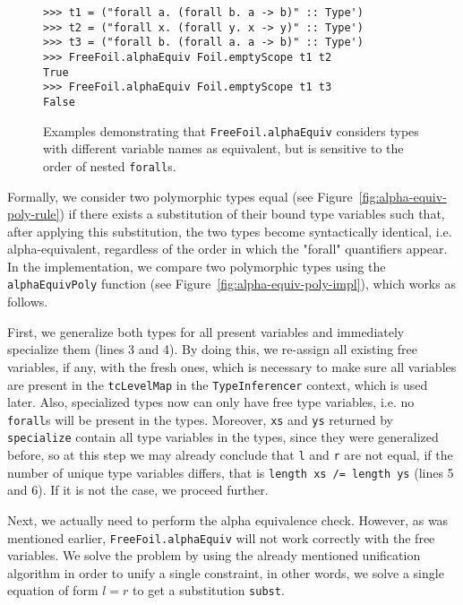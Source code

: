 \begin{figure}[H]
  \begin{verbatim}
>>> t1 = ("forall a. (forall b. a -> b)" :: Type')
>>> t2 = ("forall x. (forall y. x -> y)" :: Type')
>>> t3 = ("forall b. (forall a. a -> b)" :: Type')
>>> FreeFoil.alphaEquiv Foil.emptyScope t1 t2
True
>>> FreeFoil.alphaEquiv Foil.emptyScope t1 t3
False
  \end{verbatim}
  \caption[\texttt{FreeFoil.alphaEquiv} usage examples (2)]{Examples demonstrating that \texttt{FreeFoil.alphaEquiv} considers types with different variable names as equivalent, but is sensitive to the order of nested \texttt{forall}s.}
  \label{fig:freefoil-alphaequiv-foralls}
\end{figure}

Formally, we consider two polymorphic types equal (see Figure~\ref{fig:alpha-equiv-poly-rule}) if there exists a substitution of their bound type variables such that, after applying this substitution, the two types become syntactically identical, i.e. alpha-equivalent, regardless of the order in which the "forall" quantifiers appear. In the implementation, we compare two polymorphic types using the \texttt{alphaEquivPoly} function (see Figure~\ref{fig:alpha-equiv-poly-impl}), which works as follows.

First, we generalize both types for all present variables and immediately specialize them (lines 3 and 4). By doing this, we re-assign all existing free variables, if any, with the fresh ones, which is necessary to make sure all variables are present in the \texttt{tcLevelMap} in the \texttt{TypeInferencer} context, which is used later. Also, specialized types now can only have free type variables, i.e. no \texttt{forall}s will be present in the types. Moreover, \texttt{xs} and \texttt{ys} returned by \texttt{specialize} contain all type variables in the types, since they were generalized before, so at this step we may already conclude that \texttt{l} and \texttt{r} are not equal, if the number of unique type variables differs, that is \texttt{length xs /= length ys} (lines 5 and 6). If it is not the case, we proceed further.

Next, we actually need to perform the alpha equivalence check. However, as was mentioned earlier, \texttt{FreeFoil.alphaEquiv} will not work correctly with the free variables. We solve the problem by using the already mentioned unification algorithm in order to unify a single constraint, in other words, we solve a single equation of form $l = r$ to get a substitution \texttt{subst}.

